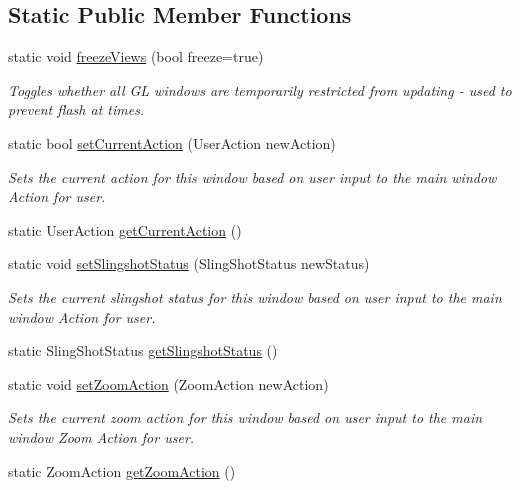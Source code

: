 \subsection*{Static Public Member Functions}
\begin{DoxyCompactItemize}
\item 
static void \hyperlink{class_mosaic_base_a8bef36bb483c9525b05a483775954ecc}{freezeViews} (bool freeze=true)
\begin{DoxyCompactList}\small\item\em Toggles whether all GL windows are temporarily restricted from updating -\/ used to prevent flash at times. \end{DoxyCompactList}\item 
\hypertarget{class_mosaic_base_a06a5cd17565b3bf24d904913b865e38e}{
static bool \hyperlink{class_mosaic_base_a06a5cd17565b3bf24d904913b865e38e}{setCurrentAction} (UserAction newAction)}
\label{class_mosaic_base_a06a5cd17565b3bf24d904913b865e38e}

\begin{DoxyCompactList}\small\item\em Sets the current action for this window based on user input to the main window  Action for user. \end{DoxyCompactList}\item 
static UserAction \hyperlink{class_mosaic_base_a9cec5c864b2b1b12322d36c7ae0e9784}{getCurrentAction} ()
\item 
\hypertarget{class_mosaic_base_af352e4439fca8fa2c9bbbc5815270331}{
static void \hyperlink{class_mosaic_base_af352e4439fca8fa2c9bbbc5815270331}{setSlingshotStatus} (SlingShotStatus newStatus)}
\label{class_mosaic_base_af352e4439fca8fa2c9bbbc5815270331}

\begin{DoxyCompactList}\small\item\em Sets the current slingshot status for this window based on user input to the main window  Action for user. \end{DoxyCompactList}\item 
static SlingShotStatus \hyperlink{class_mosaic_base_a572fff9e1e87029704ce7986d16b30be}{getSlingshotStatus} ()
\item 
\hypertarget{class_mosaic_base_a78abeaf30501c45e42c23ae5e0c55f61}{
static void \hyperlink{class_mosaic_base_a78abeaf30501c45e42c23ae5e0c55f61}{setZoomAction} (ZoomAction newAction)}
\label{class_mosaic_base_a78abeaf30501c45e42c23ae5e0c55f61}

\begin{DoxyCompactList}\small\item\em Sets the current zoom action for this window based on user input to the main window  Zoom Action for user. \end{DoxyCompactList}\item 
static ZoomAction \hyperlink{class_mosaic_base_aa352e68854016959a4b765a700b2d196}{getZoomAction} ()
\end{DoxyCompactItemize}
